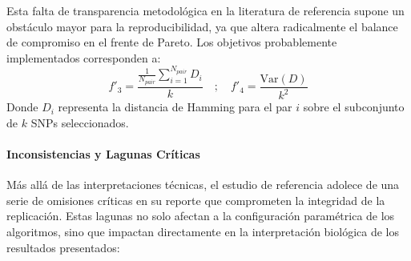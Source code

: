 \documentclass[a4paper,10pt]{article}
\begin{document}
\begin{itemize}
    Esta falta de transparencia metodológica en la literatura de referencia supone un obstáculo mayor para la reproducibilidad, ya que altera radicalmente el balance de compromiso en el frente de Pareto. Los objetivos probablemente implementados corresponden a:
    \begin{equation}
        f'_3 = \frac{\frac{1}{N_{pair}} \sum_{i=1}^{N_{pair}} D_i}{k} \quad ; \quad f'_4 = \frac{\text{Var}(D)}{k^2}
    \end{equation}
    Donde $D_i$ representa la distancia de Hamming para el par $i$ sobre el subconjunto de $k$ SNPs seleccionados.
\end{itemize}



\paragraph{Inconsistencias y Lagunas Críticas}
Más allá de las interpretaciones técnicas, el estudio de referencia adolece de una serie de omisiones críticas en su reporte que comprometen la integridad de la replicación. Estas lagunas no solo afectan a la configuración paramétrica de los algoritmos, sino que impactan directamente en la interpretación biológica de los resultados presentados:
\end{document}
